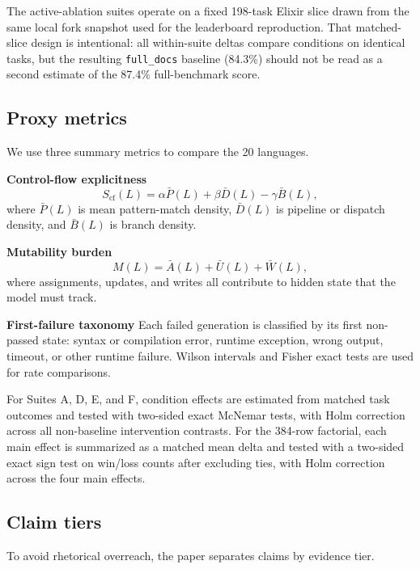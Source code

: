 \documentclass[11pt]{article}
\newcommand{\cfscore}{S_{\mathrm{cf}}}
\newcommand{\mutscore}{M}
\begin{document}
The active-ablation suites operate on a fixed 198-task Elixir slice drawn from the same local fork snapshot used for the leaderboard reproduction. That matched-slice design is intentional: all within-suite deltas compare conditions on identical tasks, but the resulting \texttt{full\_docs} baseline (84.3\%) should not be read as a second estimate of the 87.4\% full-benchmark score.

\subsection{Proxy metrics}

We use three summary metrics to compare the 20 languages.

\textbf{Control-flow explicitness}
\begin{equation}
\cfscore(L) = \alpha \bar{P}(L) + \beta \bar{D}(L) - \gamma \bar{B}(L),
\label{eq:cf}
\end{equation}
where $\bar{P}(L)$ is mean pattern-match density, $\bar{D}(L)$ is pipeline or dispatch density, and $\bar{B}(L)$ is branch density.

\textbf{Mutability burden}
\begin{equation}
\mutscore(L) = \bar{A}(L) + \bar{U}(L) + \bar{W}(L),
\label{eq:mut}
\end{equation}
where assignments, updates, and writes all contribute to hidden state that the model must track.

\textbf{First-failure taxonomy}
Each failed generation is classified by its first non-passed state: syntax or compilation error, runtime exception, wrong output, timeout, or other runtime failure. Wilson intervals and Fisher exact tests are used for rate comparisons.

For Suites A, D, E, and F, condition effects are estimated from matched task outcomes and tested with two-sided exact McNemar tests, with Holm correction across all non-baseline intervention contrasts. For the 384-row factorial, each main effect is summarized as a matched mean delta and tested with a two-sided exact sign test on win/loss counts after excluding ties, with Holm correction across the four main effects.

\subsection{Claim tiers}

To avoid rhetorical overreach, the paper separates claims by evidence tier.
\end{document}
